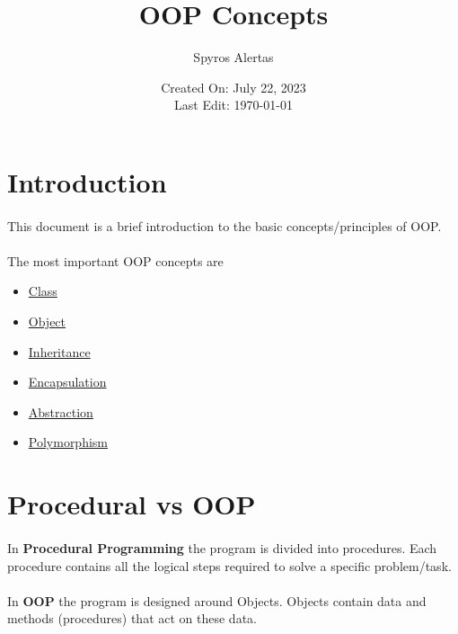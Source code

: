 \documentclass{article}
\title{\bfseries{\ac{OOP} Concepts}}
\author{Spyros Alertas}
\date{Created On: July 22, 2023\\Last Edit: \today}
\begin{document}
\begin{titlingpage}
\maketitle
\end{titlingpage}


\tableofcontents


\newpage
\section{Introduction}
\paragraph{} This document is a brief introduction to the basic concepts/principles of \acf{OOP}.\\
\paragraph{} The most important \acs{OOP} concepts are
\begin{itemize}
	\item \hyperref[sec:class]{Class}
	\item \hyperref[sec:object]{Object}
	\item \hyperref[sec:inheritance]{Inheritance}
	\item \hyperref[sec:encapsulation]{Encapsulation}
	\item \hyperref[sec:abstraction]{Abstraction}
	\item \hyperref[sec:polymorphism]{Polymorphism}
\end{itemize}


\section{Procedural vs \acl{OOP}}
\paragraph{} In \textbf{Procedural Programming} the program is divided into procedures. Each procedure contains all the logical steps required to solve a specific problem/task.
\paragraph{} In \textbf{\acl{OOP}} the program is designed around Objects. Objects contain data and methods (procedures) that act on these data.
\end{document}
